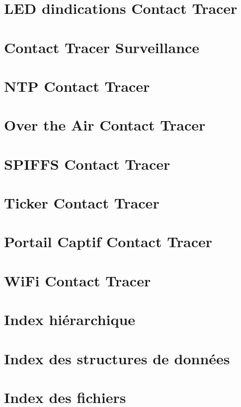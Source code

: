 \documentclass[twoside]{book}
\newcommand{\+}{\discretionary{\mbox{\scriptsize$\hookleftarrow$}}{}{}}
\begin{document}
\chapter{LED d\textquotesingle{}indications Contact Tracer}
\label{_c_t_l_e_d}

\chapter{Contact Tracer Surveillance}
\label{_c_t_monitoring}

\chapter{NTP Contact Tracer}
\label{_c_t_n_t_p}

\chapter{Over the Air Contact Tracer}
\label{_c_t_o_t_a}

\chapter{SPIFFS Contact Tracer}
\label{_c_t_s_p_i_f_f_s}

\chapter{Ticker Contact Tracer}
\label{_c_t_ticker}

\chapter{Portail Captif Contact Tracer}
\label{_c_t_web_server}

\chapter{Wi\+Fi Contact Tracer}
\label{_c_t_wi_f_i}

\chapter{Index hiérarchique}

\chapter{Index des structures de données}

\chapter{Index des fichiers}

\end{document}
